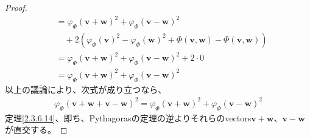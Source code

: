 \documentclass[dvipdfmx]{jsarticle}
\begin{document}
\begin{proof}
\begin{align*}
&= {\varphi_{\varPhi}\left( \mathbf{v} + \mathbf{w} \right)}^{2} + {\varphi_{\varPhi}\left( \mathbf{v} - \mathbf{w} \right)}^{2} \\
&\quad + 2\left( {\varphi_{\varPhi}\left( \mathbf{v} \right)}^{2} - {\varphi_{\varPhi}\left( \mathbf{w} \right)}^{2} + \varPhi\left( \mathbf{v},\mathbf{w} \right) - \varPhi\left( \mathbf{v},\mathbf{w} \right) \right)\\
&= {\varphi_{\varPhi}\left( \mathbf{v} + \mathbf{w} \right)}^{2} + {\varphi_{\varPhi}\left( \mathbf{v} - \mathbf{w} \right)}^{2} + 2 \cdot 0\\
&= {\varphi_{\varPhi}\left( \mathbf{v} + \mathbf{w} \right)}^{2} + {\varphi_{\varPhi}\left( \mathbf{v} - \mathbf{w} \right)}^{2}
\end{align*}
以上の議論により、次式が成り立つなら、
\begin{align*}
{\varphi_{\varPhi}\left( \mathbf{v} + \mathbf{w} + \mathbf{v} - \mathbf{w} \right)}^{2} = {\varphi_{\varPhi}\left( \mathbf{v} + \mathbf{w} \right)}^{2} + {\varphi_{\varPhi}\left( \mathbf{v} - \mathbf{w} \right)}^{2}
\end{align*}
定理\ref{2.3.6.14}、即ち、Pythagorasの定理の逆よりそれらのvectors$\mathbf{v} + \mathbf{w}$、$\mathbf{v} - \mathbf{w}$が直交する。
\end{proof}
\end{document}

